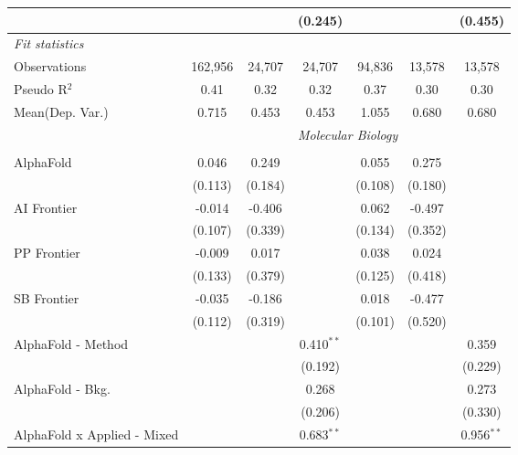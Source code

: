 \begin{tabular}{lcccccc}
                                 &         &               & (0.245)        &         &               & (0.455)\\   
   \midrule
   \emph{Fit statistics}\\
   Observations                  & 162,956 & 24,707        & 24,707         & 94,836  & 13,578        & 13,578\\  
   Pseudo R$^2$                  & 0.41    & 0.32          & 0.32           & 0.37    & 0.30          & 0.30\\  
Mean(Dep. Var.) & 0.715 & 0.453 & 0.453 & 1.055 & 0.680 & 0.680 \\
   
 & \multicolumn{6}{c}{\textit{Molecular Biology}} \\ \\
   AlphaFold                     & 0.046   & 0.249   &               & 0.055   & 0.275   &   \\   
                                 & (0.113) & (0.184) &               & (0.108) & (0.180) &   \\   
   AI Frontier                   & -0.014  & -0.406  &               & 0.062   & -0.497  &   \\   
                                 & (0.107) & (0.339) &               & (0.134) & (0.352) &   \\   
   PP Frontier                   & -0.009  & 0.017   &               & 0.038   & 0.024   &   \\   
                                 & (0.133) & (0.379) &               & (0.125) & (0.418) &   \\   
   SB Frontier                   & -0.035  & -0.186  &               & 0.018   & -0.477  &   \\   
                                 & (0.112) & (0.319) &               & (0.101) & (0.520) &   \\   
   AlphaFold - Method            &         &         & 0.410$^{**}$  &         &         & 0.359\\   
                                 &         &         & (0.192)       &         &         & (0.229)\\   
   AlphaFold - Bkg.              &         &         & 0.268         &         &         & 0.273\\   
                                 &         &         & (0.206)       &         &         & (0.330)\\   
   AlphaFold x Applied - Mixed   &         &         & 0.683$^{**}$  &         &         & 0.956$^{**}$\\   

\end{tabular}
